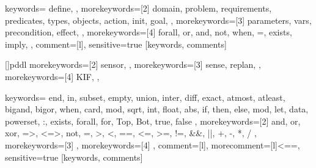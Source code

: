 {
    keywords={
        define,
    },
    morekeywords={[2]
        domain,
        problem,
        requirements,
        predicates,
        types,
        objects,
        action,
        init,
        goal,
    },
    morekeywords={[3]
        parameters,
        vars,
        precondition,
        effect,
    },
    morekeywords={[4]
        forall,
        or,
        and,
        not,
        when,
        =,
        exists,
        imply,
    },
    comment=[l]{\;},
    sensitive=true
}[keywords, comments]

[]{pddl}
{
    morekeywords={[2]
      sensor,
    },
    morekeywords={[3]
      sense,
      replan,
    },
    morekeywords={[4]
      KIF,
    },
}

{
    keywords={
        end,
        in,
        subset,
        empty,
        union,
        inter,
        diff,
        exact,
        atmost,
        atleast,
        bigand,
        bigor,
        when,
        card,
        mod,
        sqrt,
        int,
        float,
        abs,
        if,
        then,
        else,
        mod,
        let,
        data,
        powerset,
        :,
        exists,
        forall,
        for,
        Top,
        Bot,
        true,
        false
    },
    morekeywords={[2]
        and,
        or,
        xor,
        =>,
        <=>,
        not,
        =,
        >,
        <,
        ==,
        <=,
        >=,
        !=,
        &&,
        ||,
        +,
        -,
        *,
        /
    },
    morekeywords={[3]
    },
    morekeywords={[4]
    },
    comment=[l]{\;\;},
    morecomment=[l]{<==}, %
    sensitive=true
}[keywords, comments]
